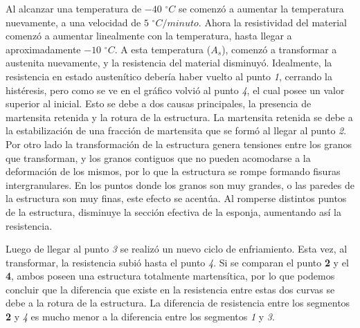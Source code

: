 \documentclass[a4paper,12pt,fleqn,twoside,openany]{book}
\begin{document}
 Al alcanzar una temperatura de $-40$ $^\circ C$ se comenzó a aumentar la temperatura nuevamente, a una velocidad de $5$ $^\circ C/minuto$. Ahora la resistividad del material comenzó a aumentar linealmente con la temperatura, hasta llegar a aproximadamente $-10$ $^\circ C$. A esta temperatura ($A_s$), comenzó a transformar a austenita nuevamente, y la resistencia del material disminuyó. Idealmente, la resistencia en estado austenítico debería haber vuelto al punto \textit{1}, cerrando la histéresis, pero como se ve en el gráfico volvió al punto \textit{4}, el cual posee un valor superior al inicial. Esto se debe a dos causas principales, la presencia de martensita retenida y la rotura de la estructura. La martensita retenida se debe a la estabilización de una fracción de martensita que se formó al llegar al punto \textit{2}. Por otro lado la transformación de la estructura genera tensiones entre los granos que transforman, y los granos contiguos que no pueden acomodarse a la deformación de los mismos, por lo que la estructura se rompe formando fisuras intergranulares. En los puntos donde los granos son muy grandes, o las paredes de la estructura son muy finas, este efecto se acentúa. Al romperse distintos puntos de la estructura, disminuye la sección efectiva de la esponja, aumentando así la resistencia.

 Luego de llegar al punto \textit{3} se realizó un nuevo ciclo de enfriamiento. Esta vez, al transformar, la resistencia subió hasta el punto \textit{4}. Si se comparan el punto \textbf{2} y el \textbf{4}, ambos poseen una estructura totalmente martensítica, por lo que podemos concluir que la diferencia que existe en la resistencia entre estas dos curvas se debe a la rotura de la estructura. 
 La diferencia de resistencia entre los segmentos \textbf{2} y \textit{4} es mucho menor a la diferencia entre los segmentos \textit{1} y \textit{3}. 
%  
%  
 
\end{document}
